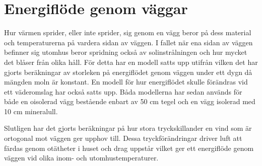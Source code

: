 \section{Energiflöde genom väggar}

Hur värmen sprider, eller inte sprider, sig genom en vägg beror på dess material och temperaturerna på vardera sidan av väggen. I fallet när ena sidan av väggen befinner sig utomhus beror spridning också av solinstrålningen och hur mycket det blåser från olika håll. För detta har en modell satts upp utifrån vilken det har gjorts beräkningar av storleken på energiflödet genom väggen under ett dygn då mängden moln är konstant. En modell för hur energiflödet skulle förändras vid ett väderomslag har också satts upp. Båda modellerna har sedan används för både en oisolerad vägg bestående enbart av 50 cm tegel och en vägg isolerad med 10 cm mineralull.

Slutligen har det gjorts beräkningar på hur stora tryckskillander en vind som är ortogonal mot väggen ger upphov till. Dessa tryckförändringar driver luft att färdas genom otätheter i huset och drag uppstår vilket ger ett energiflöde genom väggen vid olika inom- och utomhustemperaturer.





% 


